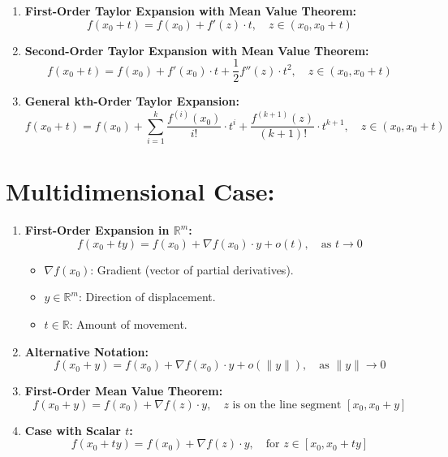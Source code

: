 \documentclass{article}
\begin{document}
\begin{enumerate}
    \item \textbf{First-Order Taylor Expansion with Mean Value Theorem:}
    \[
    f(x_0 + t) = f(x_0) + f'(z) \cdot t, \quad z \in (x_0, x_0 + t)
    \]

    \item \textbf{Second-Order Taylor Expansion with Mean Value Theorem:}
    \[
    f(x_0 + t) = f(x_0) + f'(x_0) \cdot t + \frac{1}{2} f''(z) \cdot t^2, \quad z \in (x_0, x_0 + t)
    \]

    \item \textbf{General kth-Order Taylor Expansion:}
    \[
    f(x_0 + t) = f(x_0) + \sum_{i=1}^{k} \frac{f^{(i)}(x_0)}{i!} \cdot t^i + \frac{f^{(k+1)}(z)}{(k+1)!} \cdot t^{k+1}, \quad z \in (x_0, x_0 + t)
    \]
\end{enumerate}

\section*{Multidimensional Case:}

\begin{enumerate}
    \item \textbf{First-Order Expansion in $\mathbb{R}^{m}$:}
    \[
    f(x_0 + ty) = f(x_0) + \nabla f(x_0) \cdot y + o(t), \quad \text{as } t \to 0
    \]
    \begin{itemize}
        \item $\nabla f(x_0)$: Gradient (vector of partial derivatives).
        \item $y \in \mathbb{R}^m$: Direction of displacement.
        \item $t \in \mathbb{R}$: Amount of movement.
    \end{itemize}

    \item \textbf{Alternative Notation:}
    \[
    f(x_0 + y) = f(x_0) + \nabla f(x_0) \cdot y + o(\|y\|), \quad \text{as } \|y\| \to 0
    \]

    \item \textbf{First-Order Mean Value Theorem:}
    \[
    f(x_0 + y) = f(x_0) + \nabla f(z) \cdot y, \quad z \text{ is on the line segment } [x_0, x_0 + y]
    \]

    \item \textbf{Case with Scalar $t$:}
    \[
    f(x_0 + ty) = f(x_0) + \nabla f(z) \cdot y, \quad \text{for } z \in [x_0, x_0 + ty]
    \]
\end{enumerate}
\end{document}
